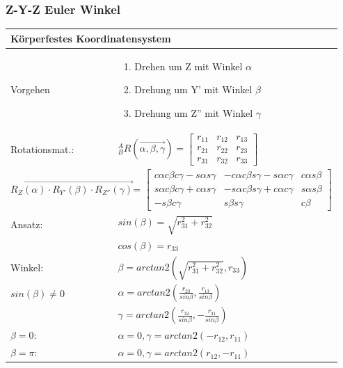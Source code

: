 \begin{minipage}{9.5cm}
    \vspace{0.5cm}
    \subsubsection{Z-Y-Z Euler Winkel }
   	\begin{tabular}{|p{2.5cm}|p{6cm}|}
    \hline
       	\multicolumn{2}{|l|}{Körperfestes Koordinatensystem}\\  	
    \hline
    Vorgehen&
    \vspace{-0.3cm}
    \begin{enumerate}
        \item Drehen um Z mit Winkel $\alpha$
        \item Drehung um Y' mit Winkel $\beta$
        \item Drehung um Z'' mit Winkel $\gamma$\vspace{-0.5cm}
    \end{enumerate}\\
    \hline
       	Rotationsmat.:
   		& ${^A_B}R(\overrightarrow{\alpha,\beta,\gamma}) = 
   			\begin{bmatrix} 
		    	r_{11} & r_{12} & r_{13} \\
       r_{21} & r_{22} & r_{23} \\
       r_{31} & r_{32} & r_{33}                              
   \end{bmatrix}$ \\
	\hline
        \multicolumn{2}{|l|}{{\scriptsize 
        $ \overrightarrow{R_Z(\alpha)\cdot R_{Y'}(\beta) \cdot R_{Z''}(\gamma)}$= $\begin{bmatrix} 
           c\alpha c\beta c\gamma - s \alpha s \gamma &-c\alpha c\beta s\gamma-s\alpha c\gamma &c\alpha s\beta \\
           s\alpha c\beta c\gamma + c \alpha s \gamma& -s\alpha c\beta s\gamma+c\alpha c\gamma & s\alpha s\beta\\
           -s\beta c\gamma& s\beta s\gamma& c\beta
        \end{bmatrix}$
    }}\\\hline 
		Ansatz:
		& $sin(\beta) = \sqrt{r^2_{31} + r^2_{32}}$ \\
		& $cos(\beta) = r_{33}$\\
	\hline
		Winkel:
		& $\beta=arctan2(\sqrt{r^2_{31}+r^2_{32}},r_{33})$\\
		$ sin(\beta) \neq 0 $& $\alpha=arctan2(\frac{r_{23}}{sin\beta},\frac{r_{13}}{sin\beta})$\\
		& $\gamma=arctan2(\frac{r_{32}}{sin\beta},-\frac{r_{31}}{sin\beta})$\\
	\hline
		$\beta=0$:
		& $\alpha=0,\gamma=arctan2(-r_{12},r_{11})$\\
		$\beta=\pi$:
		& $\alpha=0,\gamma=arctan2(r_{12},-r_{11})$\\
	\hline
    \end{tabular} 	
\end{minipage}
	
\clearpage



 
